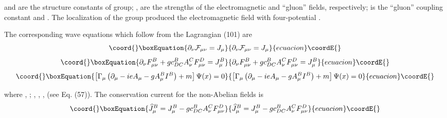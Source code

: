 \documentclass[a4paper,12pt]{article}
\begin{document}
and \coordHE{} are the structure constants of \coordHE{} group;
\coordHE{}, \coordHE{} are the strengths of
the electromagnetic and ``gluon'' fields, respectively; \coordHE{} is the
``gluon'' coupling constant and \coordHE{}  \myHighlight{$[\alpha \beta ],$}\coordHE{}  \myHighlight{$\widetilde{\mu },$}\coordHE{}  \coordHE{} . The localization of the
\coordHE{} group produced the electromagnetic field with
four-potential \coordHE{}.

The corresponding wave equations which follow from the Lagrangian (101) are
\begin{equation}\coord{}\boxEquation{
\partial _\nu \mathcal{F}_{\mu \nu }=J_\mu  \label{103}
}{
\partial _\nu \mathcal{F}_{\mu \nu }=J_\mu  }{ecuacion}\coordE{}\end{equation}
\begin{equation}\coord{}\boxEquation{
\partial _\nu F_{\mu \nu }^B+gc_{DC}^BA_\nu ^CF_{\mu \nu }^D=J_\mu ^B
\label{104}
}{
\partial _\nu F_{\mu \nu }^B+gc_{DC}^BA_\nu ^CF_{\mu \nu }^D=J_\mu ^B
}{ecuacion}\coordE{}\end{equation}
\begin{equation}\coord{}\boxEquation{
\left[ \Gamma _\mu \left( \partial _\mu -ieA_\mu -gA_\mu ^BI^B\right)
+m\right] \Psi (x)=0  \label{105}
}{
\left[ \Gamma _\mu \left( \partial _\mu -ieA_\mu -gA_\mu ^BI^B\right)
+m\right] \Psi (x)=0  }{ecuacion}\coordE{}\end{equation}

where \coordHE{}, \coordHE{}; \coordHE{}, \coordHE{}, \coordHE{}, \myHighlight{$ \overline{\Gamma
}_5\overline{\Gamma }_\mu $}\coordHE{} (see Eq. (57)). The conservation
current for the non-Abelian fields is
\begin{equation}\coord{}\boxEquation{
\widehat{J}_\mu ^B=J_\mu ^B-gc_{DC}^BA_\nu ^CF_{\mu \nu }^D  \label{106}
}{
\widehat{J}_\mu ^B=J_\mu ^B-gc_{DC}^BA_\nu ^CF_{\mu \nu }^D  }{ecuacion}\coordE{}\end{equation}
\end{document}
